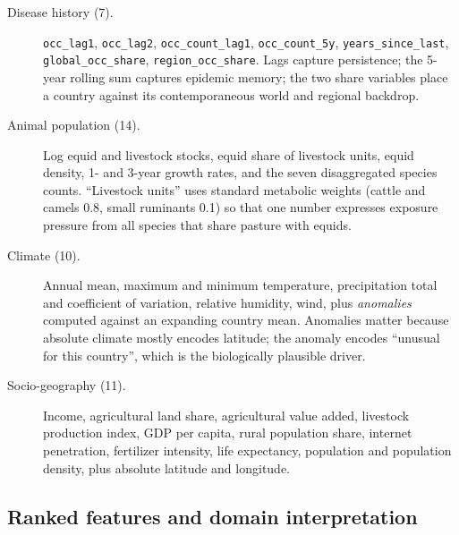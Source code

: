 \documentclass[11pt]{article}
\begin{document}
\begin{description}
  \item[Disease history (7).] \texttt{occ\_lag1}, \texttt{occ\_lag2},
        \texttt{occ\_count\_lag1}, \texttt{occ\_count\_5y}, \texttt{years\_since\_last},
        \texttt{global\_occ\_share}, \texttt{region\_occ\_share}.
        Lags capture persistence; the 5-year rolling sum captures epidemic memory; the two share
        variables place a country against its contemporaneous world and regional backdrop.
  \item[Animal population (14).] Log equid and livestock stocks, equid share of livestock units,
        equid density, 1- and 3-year growth rates, and the seven disaggregated species counts.
        ``Livestock units'' uses standard metabolic weights (cattle and camels 0.8, small ruminants
        0.1) so that one number expresses exposure pressure from all species that share pasture
        with equids.
  \item[Climate (10).] Annual mean, maximum and minimum temperature, precipitation total and
        coefficient of variation, relative humidity, wind, plus \emph{anomalies} computed
        against an expanding country mean. Anomalies matter because absolute climate mostly encodes
        latitude; the anomaly encodes ``unusual for this country'', which is the biologically
        plausible driver.
  \item[Socio-geography (11).] Income, agricultural land share, agricultural value added,
        livestock production index, GDP per capita, rural population share, internet penetration,
        fertilizer intensity, life expectancy, population and population density, plus absolute
        latitude and longitude.
\end{description}

\subsection{Ranked features and domain interpretation}
\end{document}
